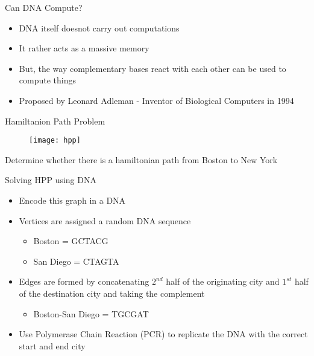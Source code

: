 \documentclass[10pt]{beamer}
\begin{document}
\begin{frame}[fragile]{Can DNA Compute?}
         \begin{itemize}
      \item DNA itself doesnot carry out computations
      \item It rather acts as a massive memory
            \item But, the way complementary bases react with each other can be used to         compute things
            \item Proposed by Leonard Adleman - Inventor of Biological Computers in 1994
    \end{itemize}
\end{frame}

\begin{frame}[fragile]{Hamiltanion Path Problem}
  \begin{figure}
             \texttt{[image: hpp]} 
  \end{figure}
    Determine whether there is a hamiltonian path from Boston to New York
\end{frame}

\begin{frame}[fragile]{Solving HPP using DNA}
  \begin{itemize}
    \item Encode this graph in a DNA
        \item{  Vertices are assigned a random DNA sequence 
          \begin{itemize}
        \item Boston = GCTACG
        \item San Diego = CTAGTA
      \end{itemize}}
         \item{  Edges are formed by concatenating $2^{nd}$ half of the originating city and $1^{st}$ half of the destination city and taking the complement
          \begin{itemize}
        \item Boston-San Diego = TGCGAT
      \end{itemize}}
            \item Use Polymerase Chain Reaction (PCR) to replicate the DNA with the correct start and end city
  \end{itemize}
\end{frame}
\end{document}
